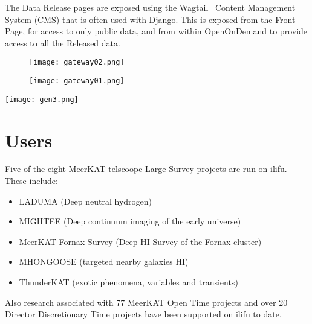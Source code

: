 \documentclass[12pt,twocolumn,a4paper]{article}
\begin{document}
The Data Release pages are exposed using the Wagtail~\cite{Wagtail} Content Management System (CMS)
that is often used with Django. This is exposed from the Front Page, for access to only public data,
and from within OpenOnDemand to provide access to all the Released data.



\begin{figure}
\texttt{[image: gateway02.png]}
\end{figure}

\begin{figure}
    \texttt{[image: gateway01.png]}
\end{figure}
    



\texttt{[image: gen3.png]}






\section{Users}
\label{sec:users}

Five of the eight MeerKAT telscoope Large Survey projects are run on ilifu. 
These include:
\begin{itemize}
\item LADUMA (Deep neutral hydrogen)
\item MIGHTEE (Deep continuum imaging of the early universe)
\item MeerKAT Fornax Survey (Deep HI Survey of the Fornax cluster)
\item MHONGOOSE (targeted nearby galaxies HI)
\item ThunderKAT (exotic phenomena, variables and transients)
\end{itemize}

Also research associated with 
77 MeerKAT Open Time projects and over 20 Director Discretionary Time projects have been supported
on ilifu to date.
\end{document}
